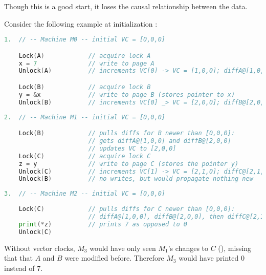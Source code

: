 \noindent
Though this is a good start, it loses the causal relationship between the data.
\begin{Example}

    Consider the following example at initialization :
    \begin{lstlisting}[language=Go, numbers=none]
1.  // -- Machine M0 -- initial VC = [0,0,0]

    Lock(A)            // acquire lock A
    x = 7              // write to page A
    Unlock(A)          // increments VC[0] -> VC = [1,0,0]; diffA@[1,0,0]

    Lock(B)            // acquire lock B
    y = &x             // write to page B (stores pointer to x)
    Unlock(B)          // increments VC[0] _> VC = [2,0,0]; diffB@[2,0,0]

    \end{lstlisting}

    \begin{lstlisting}[language=Go, numbers=none]
2.  // -- Machine M1 -- initial VC = [0,0,0]

    Lock(B)            // pulls diffs for B newer than [0,0,0]:
                       // gets diffA@[1,0,0] and diffB@[2,0,0]
                       // updates VC to [2,0,0]
    Lock(C)            // acquire lock C
    z = y              // write to page C (stores the pointer y)
    Unlock(C)          // increments VC[1] -> VC = [2,1,0]; diffC@[2,1,0]
    Unlock(B)          // no writes, but would propagate nothing new
    \end{lstlisting}

    \begin{lstlisting}[language=Go, numbers=none]
3.  // -- Machine M2 -- initial VC = [0,0,0]
    
    Lock(C)            // pulls diffs for C newer than [0,0,0]:
                       // diffA@[1,0,0], diffB@[2,0,0], then diffC@[2,1,0]
    print(*z)          // prints 7 as opposed to 0
    Unlock(C)          
    \end{lstlisting}
    \noindent
    Without vector clocks, $M_3$ would have only seen $M_1$'s changes to $C$ (), missing that 
    that $A$ and $B$ were modified before. Therefore $M_3$ would have printed 0 instead of 7.
\end{Example}

\newpage 

